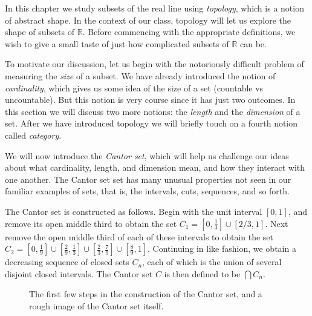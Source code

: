 \documentclass[11pt,oneside]{amsbook}
\newcommand{\R}{\mathbb R}
\theoremstyle{definition}
\theoremstyle{plain}
\theoremstyle{definition}
\theoremstyle{remark}
\numberwithin{equation}{section}
\numberwithin{figure}{section}
\begin{document}
In this chapter we study subsets of the real line using \emph{topology}, which is a notion of abstract shape. In the context of our class, topology will let us explore the shape of subsets of $\R$. Before commencing with the appropriate definitions, we wish to give a small taste of just how complicated subsets of $\R$ can be.

To motivate our discussion, let us begin with the notoriously difficult problem of measuring the \emph{size} of a subset. We have already introduced the notion of \emph{cardinality}, which gives us some idea of the size of a set (countable vs uncountable). But this notion is very course since it has just two outcomes. In this section we will discuss two more notions: the \emph{length} and the \emph{dimension} of a set. After we have introduced topology we will briefly touch on a fourth notion called \emph{category}.

We will now introduce the \emph{Cantor set}, which will help us challenge our ideas about what cardinality, length, and dimension mean, and how they interact with one another. The Cantor set set has many unusual properties not seen in our familiar examples of sets, that is, the intervals, cuts, sequences, and so forth.

The Cantor set is constructed as follows. Begin with the unit interval $[0,1]$, and remove its open middle third to obtain the set $C_1=[0,\frac13]\cup[2/3,1]$. Next remove the open middle third of each of these intervals to obtain the set $C_2=[0,\frac19]\cup[\frac29,\frac13]
\cup[\frac23,\frac79]\cup[\frac89,1]$. Continuing in like fashion, we obtain a decreasing sequence of closed sets $C_n$, each of which is the union of several disjoint closed intervals. The Cantor set $C$ is then defined to be $\bigcap C_n$.

\begin{figure}[h]
\begin{center}
\end{center}
\caption{The first few steps in the construction of the Cantor set, and a rough image of the Cantor set itself.\label{fig:cantor-set}}
\end{figure}
\end{document}
